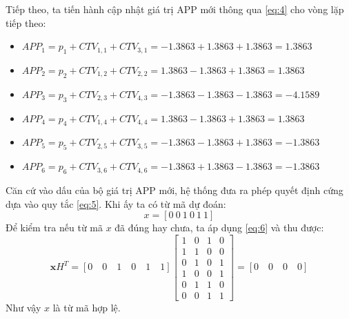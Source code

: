 \documentclass[12pt,a4paper,oneside]{book}
\begin{document}
Tiếp theo, ta tiến hành cập nhật giá trị APP mới thông qua \ref{eq:4} cho vòng lặp tiếp theo:
\begin{itemize}
    \item[] $APP_1 = p_1 + CTV_{1,1} + CTV_{3,1} = -1.3863 + 1.3863 + 1.3863 = 1.3863$
    \item[] $APP_2 = p_2 + CTV_{1,2} + CTV_{2,2} = 1.3863 -1.3863 + 1.3863 = 1.3863$
    \item[] $APP_3 = p_3 + CTV_{2,3} + CTV_{4,3} = -1.3863 -1.3863 -1.3863= -4.1589$
    \item[] $APP_4 = p_4 + CTV_{1,4} + CTV_{4,4}= 1.3863 - 1.3863 + 1.3863= 1.3863$
    \item[] $APP_5 = p_5 + CTV_{2,5} + CTV_{3,5} = -1.3863 - 1.3863 + 1.3863 = -1.3863$
    \item[] $APP_6 = p_6 + CTV_{3,6} + CTV_{4,6}= -1.3863 + 1.3863 -1.3863= -1.3863$
\end{itemize}

Căn cứ vào dấu của bộ giá trị APP mới, hệ thống đưa ra phép quyết định cứng dựa vào quy tắc \ref{eq:5}. Khi ấy ta có từ mã dự đoán:
\begin{equation}
    x = [0\ 0\ 1\ 0\ 1\ 1]
\end{equation}
Để kiểm tra nếu từ mã $x$ đã đúng hay chưa, ta áp dụng \ref{eq:6} và thu được:
\begin{equation}
    \mathbf{x}H^T = [0 \quad 0 \quad 1 \quad 0 \quad 1 \quad 1] \begin{bmatrix} 1 & 0 & 1 & 0 \\ 1 & 1 & 0 & 0 \\ 0 & 1 & 0 & 1 \\ 1 & 0 & 0 & 1 \\ 0 & 1 & 1 & 0 \\ 0 & 0 & 1 & 1 \end{bmatrix} = [0 \quad 0 \quad 0 \quad 0]
\end{equation}
Như vậy $x$ là từ mã hợp lệ.

\end{document}
